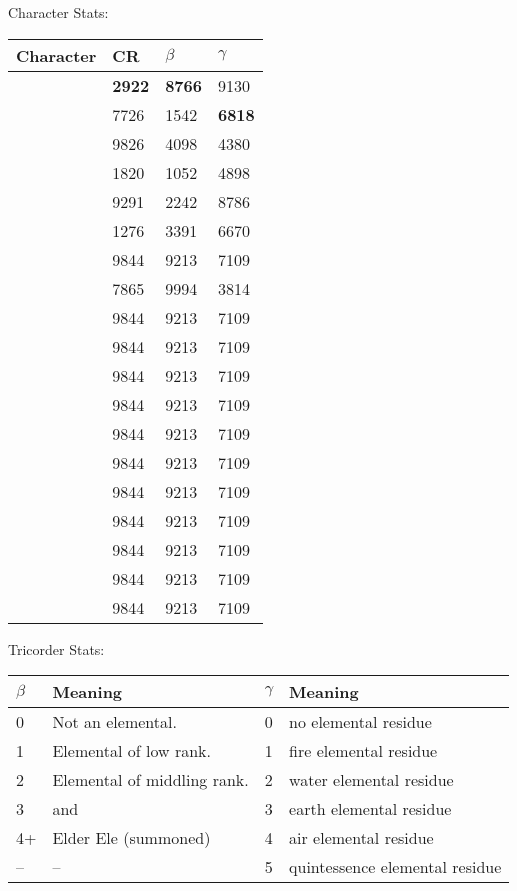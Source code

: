 \documentclass[green]{elementals}
\begin{document}
\name{\gStats{}}

Character Stats:\\

\begin{tabular}{ l || l |  l | l |}
  Character & CR & $\beta$ & $\gamma$   \\ \hline \hline
  \cQueen{} & {\bf 2922} & {\bf 8766} & 9130 \\ \hline
  \cPyro{} & 7726 & 1542 & {\bf 6818}  \\ \hline
  \cJuliet{} & 9826 & 4098 & 4380  \\ \hline
  \cLoyal{} & 1820 & 1052 & 4898  \\ \hline
  \cRogue{} & 9291 & 2242 & 8786  \\ \hline
  \cMinion{} & 1276 & 3391 & 6670  \\ \hline
  \cMiniEarth{} & 9844 & 9213 & 7109  \\ \hline
  \cKing{} & 7865 & 9994 & 3814  \\ \hline
  \cNaturalist{} & 9844 & 9213 & 7109  \\ \hline
  \cMiniAir{} & 9844 & 9213 & 7109  \\ \hline
  \cGD{} & 9844 & 9213 & 7109  \\ \hline
  \cAvatar{} & 9844 & 9213 & 7109  \\ \hline
  \cDema{} & 9844 & 9213 & 7109  \\ \hline
  \cLeader{} & 9844 & 9213 & 7109  \\ \hline
  \cMS{} & 9844 & 9213 & 7109  \\ \hline
  \cRomeo{} & 9844 & 9213 & 7109  \\ \hline
  \cScientist{} & 9844 & 9213 & 7109  \\ \hline
  \cDiplomat{} & 9844 & 9213 & 7109  \\ \hline
  \cMiniWater{} & 9844 & 9213 & 7109  \\ \hline
\end{tabular}


Tricorder Stats:\\

\begin{tabular}{ l | l ||  l | l |}
  $\beta$ & Meaning & $\gamma$ & Meaning   \\ \hline \hline
  0 & Not an elemental. & 0 & no elemental residue   \\ \hline
  1 & Elemental of low rank. & 1 & fire elemental residue   \\ \hline
  2 & Elemental of middling rank. & 2 & water elemental residue  \\ \hline
  3 & \cKing{} and \cQueen{} & 3 & earth elemental residue   \\ \hline
  4+ & Elder Ele (summoned) & 4 & air elemental residue  \\ \hline
  --& -- & 5 & quintessence elemental residue   \\ \hline
\end{tabular}
\end{document}
